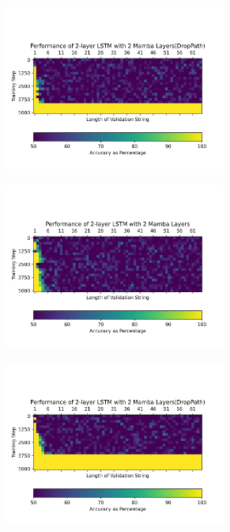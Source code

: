 \begin{figure}
\begin{subfigure}{0.5\textwidth}
\begin{center}
        \includegraphics[width=0.8\textwidth]{figures/parity_lstm_True_4_1.png}
        \end{center}
    \end{subfigure}
    \begin{subfigure}{0.5\textwidth}
        \begin{center}
        \includegraphics[width=0.8\textwidth]{figures/parity_lstm_False_4_2.png}
        \end{center}
    \end{subfigure}\begin{subfigure}{0.5\textwidth}
        \begin{center}
        \includegraphics[width=0.8\textwidth]{figures/parity_lstm_True_4_2.png}

\end{center}
\end{subfigure}
\end{figure}
